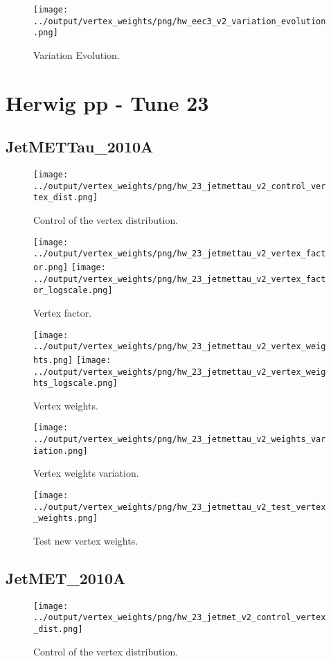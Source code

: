 \documentclass[11pt]{book}
\begin{document}
\begin{figure}[ht]
\centering
\texttt{[image: ../output/vertex\_weights/png/hw\_eec3\_v2\_variation\_evolution.png]}
\caption{Variation Evolution.}
\end{figure}
\clearpage


\section{Herwig pp - Tune 23}
\subsection{JetMETTau\_2010A}
\begin{figure}[ht]
\centering
\texttt{[image: ../output/vertex\_weights/png/hw\_23\_jetmettau\_v2\_control\_vertex\_dist.png]}
\caption{Control of the vertex distribution.}
\end{figure}

\begin{figure}[ht]
\centering
\texttt{[image: ../output/vertex\_weights/png/hw\_23\_jetmettau\_v2\_vertex\_factor.png]}
\texttt{[image: ../output/vertex\_weights/png/hw\_23\_jetmettau\_v2\_vertex\_factor\_logscale.png]}
\caption{Vertex factor.}
\end{figure}

\begin{figure}[ht]
\centering
\texttt{[image: ../output/vertex\_weights/png/hw\_23\_jetmettau\_v2\_vertex\_weights.png]}
\texttt{[image: ../output/vertex\_weights/png/hw\_23\_jetmettau\_v2\_vertex\_weights\_logscale.png]}
\caption{Vertex weights.}
\end{figure}

\begin{figure}[ht]
\centering
\texttt{[image: ../output/vertex\_weights/png/hw\_23\_jetmettau\_v2\_weights\_variation.png]}
\caption{Vertex weights variation.}
\end{figure}

\begin{figure}[ht]
\centering
\texttt{[image: ../output/vertex\_weights/png/hw\_23\_jetmettau\_v2\_test\_vertex\_weights.png]}
\caption{Test new vertex weights.}
\end{figure}
\clearpage

\subsection{JetMET\_2010A}
\begin{figure}[ht]
\centering
\texttt{[image: ../output/vertex\_weights/png/hw\_23\_jetmet\_v2\_control\_vertex\_dist.png]}
\caption{Control of the vertex distribution.}
\end{figure}
\end{document}
